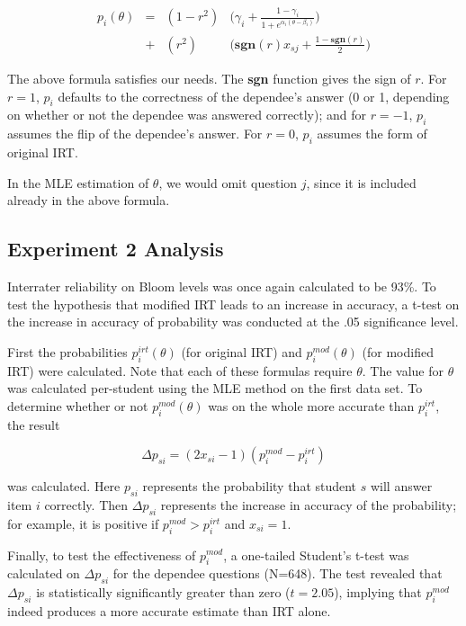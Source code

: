 \begin{align*}
  p_i(\theta) &=& (1-r^2) & \Big(\gamma_i + \frac{1-\gamma_i}{1+e^{\alpha_i(\theta-\beta_i)}}\Big) \\
              &+& (r^2)   & \Big(\mathbf{sgn}(r)x_{sj}+\frac{1-\mathbf{sgn}(r)}{2}\Big)
\end{align*}

The above formula satisfies our needs.  The \textbf{sgn} function gives the
sign of $r$.  For $r=1$, $p_i$ defaults to the correctness of the dependee's
answer (0 or 1, depending on whether or not the dependee was answered
correctly);  and for $r=-1$, $p_i$ assumes the flip of the dependee's answer.
For $r=0$, $p_i$ assumes the form of original IRT.  

In the MLE estimation of $\theta$, we would omit question $j$, since it is
included already in the above formula.


\subsection{Experiment 2 Analysis}

Interrater reliability on Bloom levels was once again calculated to be 93\%.
To test the hypothesis that modified IRT leads to an increase in accuracy, a
t-test on the increase in accuracy of probability was conducted at the .05
significance level.

First the probabilities $p_i^{irt}(\theta)$ (for original IRT) and
$p_i^{mod}(\theta)$ (for modified IRT) were calculated.  Note that each of
these formulas require $\theta$. The value for $\theta$ was calculated
per-student using the MLE method on the first data set.  To determine whether
or not $p_i^{mod}(\theta)$ was on the whole more accurate than $p_i^{irt}$, the
result

\[
  \Delta p_{si} = (2x_{si}-1) (p_i^{mod} - p_i^{irt})
\]

was calculated. Here $p_{si}$ represents the probability that student $s$ will
answer item $i$ correctly.  Then $\Delta p_{si}$ represents the increase in
accuracy of the probability; for example, it is positive if $p_i^{mod} >
p_i^{irt}$ and $x_{si} = 1$.

Finally, to test the effectiveness of $p_i^{mod}$, a one-tailed Student's
t-test was calculated on $\Delta p_{si}$ for the dependee questions (N=648).
The test revealed that $\Delta p_{si}$ is statistically significantly greater
than zero ($t=2.05$), implying that $p_i^{mod}$ indeed produces a more accurate
estimate than IRT alone. 

